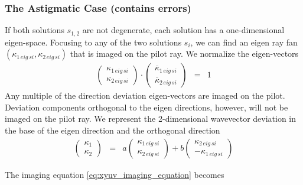 \documentclass[12pt,a4paper,twoside,openright,BCOR10mm,headsepline,titlepage,abstracton,chapterprefix,final]{scrreprt}
\begin{document}
\subsubsection{The Astigmatic Case (contains errors)}
If both solutions $s_{1,2}$ are not degenerate, each solution has a one-dimensional eigen-space.
Focusing to any of the two solutions $s_i$, 
we can find an eigen ray fan $(\kappa_{1\,eig\,si},\kappa_{2\,eig\,si})$ that is imaged on the pilot ray.
We normalize the eigen-vectors
\begin{eqnarray}
 \begin{pmatrix} \kappa_{1\,eig\,si} \\   \kappa_{2\,eig\,si} \end{pmatrix} \cdot  \begin{pmatrix} \overline{\kappa}_{1\,eig\,si} \\ \overline{\kappa}_{2\,eig\,si} \end{pmatrix}
 &=& 1
\end{eqnarray}
Any multiple of the direction deviation eigen-vectors are imaged on the pilot.
Deviation components orthogonal to the eigen directions, however, will not be imaged on the pilot ray.
We represent the 2-dimensional wavevector deviation in the base of the eigen direction and the orthogonal direction
\begin{eqnarray}
     \begin{pmatrix} \kappa_1            \\   \kappa_2            \end{pmatrix} &=& 
   a \begin{pmatrix} \kappa_{1\,eig\,si} \\   \kappa_{2\,eig\,si} \end{pmatrix} 
 + b \begin{pmatrix} \kappa_{2\,eig\,si} \\ - \kappa_{1\,eig\,si} \end{pmatrix}
\end{eqnarray}

The imaging equation \eqref{eq:xyuv_imaging_equation} becomes
\end{document}
